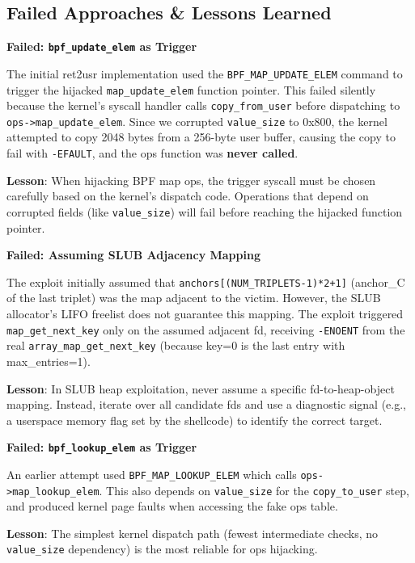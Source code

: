 \subsection{Failed Approaches \& Lessons Learned}

\textbf{Failed: \texttt{bpf\_update\_elem} as Trigger}

The initial ret2usr implementation used the \texttt{BPF\_\allowbreak MAP\_\allowbreak UPDATE\_\allowbreak ELEM} command to trigger the hijacked \texttt{map\_\allowbreak update\_\allowbreak elem} function pointer. This failed silently because the kernel's syscall handler calls \texttt{copy\_\allowbreak from\_\allowbreak user} before dispatching to \texttt{ops->map\_\allowbreak update\_\allowbreak elem}. Since we corrupted \texttt{value\_\allowbreak size} to 0x800, the kernel attempted to copy 2048 bytes from a 256-byte user buffer, causing the copy to fail with \texttt{-EFAULT}, and the ops function was \textbf{never called}.

\textbf{Lesson}: When hijacking BPF map ops, the trigger syscall must be chosen carefully based on the kernel's dispatch code. Operations that depend on corrupted fields (like \texttt{value\_size}) will fail before reaching the hijacked function pointer.

\textbf{Failed: Assuming SLUB Adjacency Mapping}

The exploit initially assumed that \texttt{anchors[(NUM\_TRIPLETS-1)*2+1]} (anchor\_C of the last triplet) was the map adjacent to the victim. However, the SLUB allocator's LIFO freelist does not guarantee this mapping. The exploit triggered \texttt{map\_get\_next\_key} only on the assumed adjacent fd, receiving \texttt{-ENOENT} from the real \texttt{array\_map\_get\_next\_key} (because key=0 is the last entry with max\_entries=1).

\textbf{Lesson}: In SLUB heap exploitation, never assume a specific fd-to-heap-object mapping. Instead, iterate over all candidate fds and use a diagnostic signal (e.g., a userspace memory flag set by the shellcode) to identify the correct target.

\textbf{Failed: \texttt{bpf\_lookup\_elem} as Trigger}

An earlier attempt used \texttt{BPF\_MAP\_LOOKUP\_ELEM} which calls \texttt{ops->map\_lookup\_elem}. This also depends on \texttt{value\_size} for the \texttt{copy\_to\_user} step, and produced kernel page faults when accessing the fake ops table.

\textbf{Lesson}: The simplest kernel dispatch path (fewest intermediate checks, no \texttt{value\_size} dependency) is the most reliable for ops hijacking.


